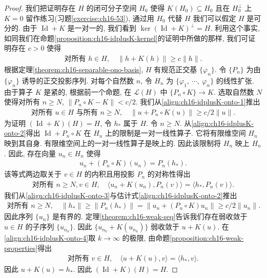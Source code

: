 \documentclass[../../main.tex]{subfiles}
\begin{document}
\begin{proof}
我们把证明存在 $H$ 的闭可分子空间 $H_{0}$ 使得 $K(H_{0})\subseteq H_{0}$ 且在 $H_{0}^{\perp}$ 上 $K=0$ 留作练习(习题\cref{exercise:ch16-53}), 通过用 $H_{0}$ 代替 $H$ 我们可以假定 $H$ 是可分的. 由于 $\operatorname{Id}+K$ 是一对一的, 我们看到 $\ker(\operatorname{Id}+K)^{\perp}=H$. 利用这个事实, 如同我们在命题\cref{proposition:ch16-idplusK-kernel}的证明中所做的那样, 我们可证明存在 $c>0$ 使得
\begin{align}
\text{对所有 }h\in H,\quad\|h+K(h)\|\geqslant c\|h\|.\label{align:ch16-idplusK-onto-1}
\end{align}
根据定理\cref{theorem:ch16-separable-ono-basis}, $H$ 有规范正交基 $\{\varphi_{n}\}$. 令 $\{P_{n}\}$ 为由 $\{\varphi_{n}\}$ 诱导的正交投影序列. 对每个自然数 $n$, 令 $H_{n}$ 为 $\{\varphi_{1},\ \cdots,\ \varphi_{n}\}$ 的线性扩张. 由于算子 $K$ 是紧的, 根据前一个命题, 在 $\mathcal{L}(H)$ 中 $\{P_{n}\circ K\}\to K$. 选取自然数 $N$ 使得对所有 $n\geqslant N$, $\|P_{n}\circ K-K\|<c/2$. 我们从\eqref{align:ch16-idplusK-onto-1}推出
\begin{align}
\text{对所有 }u\in H\text{ 与所有 }n\geqslant N,\quad\|u+P_{n}\circ K(u)\|\geqslant c/2\|u\|.\label{align:ch16-idplusK-onto-2}
\end{align}
为证明 $(\operatorname{Id}+K)(H)=H$, 令 $h_{*}$ 属于 $H$. 令 $n\geqslant N$. 从\eqref{align:ch16-idplusK-onto-2}得出 $\operatorname{Id}+P_{n}\circ K$ 在 $H_{n}$ 上的限制是一对一线性算子. 它将有限维空间 $H_{n}$ 映到其自身. 有限维空间上的一对一线性算子是映上的. 因此该限制将 $H_{n}$ 映上 $H_{n}$. 因此, 存在向量 $u_{n}\in H_{n}$ 使得
\begin{align}
u_{n}+(P_{n}\circ K)(u_{n})=P_{n}(h_{*}).\label{align:ch16-idplusK-onto-3}
\end{align}
该等式两边取关于 $v\in H$ 的内积且用投影 $P_{n}$ 的对称性得出
\begin{align}
\text{对所有 }n\geqslant N,v\in H,\quad\langle u_{n}+K(u_{n}),P_{n}(v)\rangle=\langle h_{*},P_{n}(v)\rangle.\label{align:ch16-idplusK-onto-4}
\end{align}
我们从\eqref{align:ch16-idplusK-onto-3}与估计式\eqref{align:ch16-idplusK-onto-2}推出
\begin{align*}
\text{对所有 }n\geqslant N,\quad\|h_{*}\|\geqslant\|P_{n}(h_{*})\|=\|u_{n}+(P_{n}\circ K)u_{n}\|\geqslant c/2\|u_{n}\|.
\end{align*}
因此序列 $\{u_{n}\}$ 是有界的. 定理\cref{theorem:ch16-weak-seq}告诉我们存在弱收敛于 $u\in H$ 的子序列 $\{u_{n_{k}}\}$. 因此 $\{u_{n_{k}}+K(u_{n_{k}})\}$ 弱收敛于 $u+K(u)$. 在\eqref{align:ch16-idplusK-onto-4}取 $k\to\infty$ 的极限, 由命题\cref{proposition:ch16-weak-properties}得出
\begin{align*}
\text{对所有 }v\in H,\quad\langle u+K(u),v\rangle=\langle h_{*},v\rangle.
\end{align*}
因此 $u+K(u)=h_{*}$. 因此 $(\operatorname{Id}+K)(H)=H$.
\end{proof}
\end{document}
